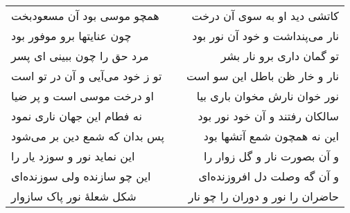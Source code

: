 \begin{center}
\begin{longtable}{l p{0.5cm} r}
همچو موسی بود آن مسعودبخت
&&
کاتشی دید او به سوی آن درخت
\\
چون عنایتها برو موفور بود
&&
نار می‌پنداشت و خود آن نور بود
\\
مرد حق را چون ببینی ای پسر
&&
تو گمان داری برو نار بشر
\\
تو ز خود می‌آیی و آن در تو است
&&
نار و خار ظن باطل این سو است
\\
او درخت موسی است و پر ضیا
&&
نور خوان نارش مخوان باری بیا
\\
نه فطام این جهان ناری نمود
&&
سالکان رفتند و آن خود نور بود
\\
پس بدان که شمع دین بر می‌شود
&&
این نه همچون شمع آتشها بود
\\
این نماید نور و سوزد یار را
&&
و آن بصورت نار و گل زوار را
\\
این چو سازنده ولی سوزنده‌ای
&&
و آن گه وصلت دل افروزنده‌ای
\\
شکل شعلهٔ نور پاک سازوار
&&
حاضران را نور و دوران را چو نار
\\
\end{longtable}
\end{center}
